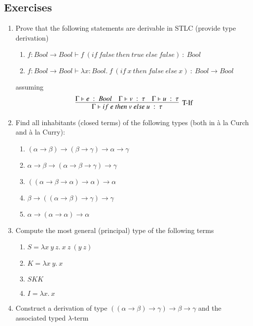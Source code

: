 \documentclass[9pt]{article}
\begin{document}
\subsection{{\color{violet}Exercises}}
\begin{enumerate}
    \item Prove that the following statements are derivable in STLC (provide type derivation)
          \begin{enumerate}
              \item $f:Bool \to Bool \vdash f\ (if\ false\ then\ true\ else\ false)\ :\ Bool$
              \item $f:Bool \to Bool \vdash \lambda x:Bool.\ f\ (if\ x\ then\ false\ else\ x)\ :\ Bool \to Bool$
          \end{enumerate}
          assuming
          \[
              \infer[\text{T-If}]{\Gamma \vdash if\ e\ then\ v\ else\ u\ :\ \tau}{
                  \Gamma \vdash e\ :\ Bool
                  \quad
                  \Gamma \vdash v\ :\ \tau
                  \quad
                  \Gamma \vdash u\ :\ \tau
              }
          \]
    \item Find all inhabitants (closed terms) of the following types (both in \`a la Curch
          and \`a la Curry):
          \begin{enumerate}
              \item $(\alpha\to\beta)\to(\beta\to\gamma)\to\alpha\to\gamma$
              \item $\alpha \to \beta \to (\alpha\to\beta\to\gamma)\to\gamma$
              \item $((\alpha\to\beta\to\alpha)\to\alpha)\to\alpha$
              \item $\beta\to((\alpha\to\beta)\to\gamma)\to\gamma$
              \item $\alpha \to (\alpha \to \alpha)\to \alpha$
          \end{enumerate}
    \item Compute the most general (principal) type of the following terms
          \begin{enumerate}
              \item $S = \lambda x\ y\ z.\ x\ z\ (y\ z)$
              \item $K = \lambda x\ y.\ x$
              \item $SKK$
              \item $I = \lambda x.\ x$
          \end{enumerate}
    \item  Construct a derivation of type $((\alpha\to\beta)\to\gamma)\to\beta\to\gamma$ and the associated typed $\lambda$-term

\end{enumerate}
\end{document}
